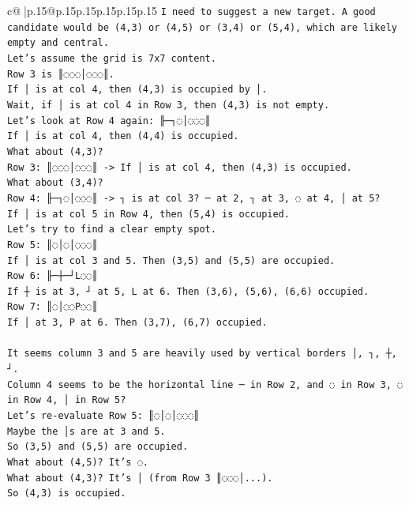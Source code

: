 \documentclass{article}
\begin{document}
{\begin{supertabular}{c@{$\;$}|p{.15\linewidth}@{}p{.15\linewidth}p{.15\linewidth}p{.15\linewidth}p{.15\linewidth}p{.15\linewidth}}
{{{\texttt{I need to suggest a new target. A good candidate would be (4,3) or (4,5) or (3,4) or (5,4), which are likely empty and central.} \\
\texttt{Let's assume the grid is 7x7 content.} \\
\texttt{Row 3 is ║◌◌◌│◌◌◌║.} \\
\texttt{If │ is at col 4, then (4,3) is occupied by │.} \\
\texttt{Wait, if │ is at col 4 in Row 3, then (4,3) is not empty.} \\
\texttt{Let's look at Row 4 again: ╟─┐◌│◌◌◌║} \\
\texttt{If │ is at col 4, then (4,4) is occupied.} \\
\texttt{What about (4,3)?} \\
\texttt{Row 3: ║◌◌◌│◌◌◌║ {-}> If │ is at col 4, then (4,3) is occupied.} \\
\texttt{What about (3,4)?} \\
\texttt{Row 4: ╟─┐◌│◌◌◌║ {-}> ┐ is at col 3? ─ at 2, ┐ at 3, ◌ at 4, │ at 5?} \\
\texttt{If │ is at col 5 in Row 4, then (5,4) is occupied.} \\
\texttt{Let's try to find a clear empty spot.} \\
\texttt{Row 5: ║◌│◌│◌◌◌║} \\
\texttt{If │ is at col 3 and 5. Then (3,5) and (5,5) are occupied.} \\
\texttt{Row 6: ╟─┼─┘L◌◌║} \\
\texttt{If ┼ is at 3, ┘ at 5, L at 6. Then (3,6), (5,6), (6,6) occupied.} \\
\texttt{Row 7: ║◌│◌◌P◌◌║} \\
\texttt{If │ at 3, P at 6. Then (3,7), (6,7) occupied.} \\
\\ 
\texttt{It seems column 3 and 5 are heavily used by vertical borders │, ┐, ┼, ┘.} \\
\texttt{Column 4 seems to be the horizontal line ─ in Row 2, and ◌ in Row 3, ◌ in Row 4, │ in Row 5?} \\
\texttt{Let's re{-}evaluate Row 5: ║◌│◌│◌◌◌║} \\
\texttt{Maybe the │s are at 3 and 5.} \\
\texttt{So (3,5) and (5,5) are occupied.} \\
\texttt{What about (4,5)? It's ◌.} \\
\texttt{What about (4,3)? It's │ (from Row 3 ║◌◌◌│...).} \\
\texttt{So (4,3) is occupied.} \\
}}}
\end{supertabular}}
\end{document}
